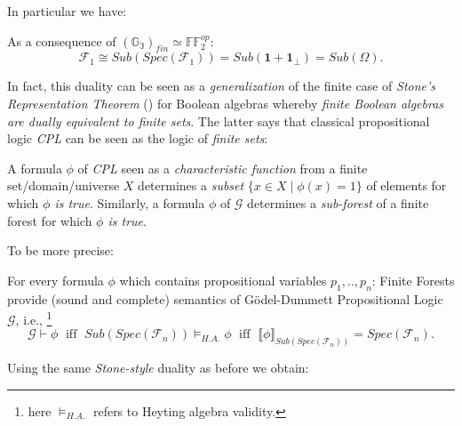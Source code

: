  	In particular we have: 
 
\begin{remark}
	As a consequence of $ (\mathbb{G_3})_{fin} \simeq \mathbb{FF}^{\textit{op}}_{2}$:
 \[\mathcal{F}_1 \cong Sub(Spec(\mathcal{F}_1)) = Sub(\textbf{1}+\textbf{1}_\bot) = Sub(\Omega).\] 
\end{remark}

In fact, this duality can be seen as a \emph{generalization} of the finite case of \emph{Stone's Representation Theorem} (\cite{stone}) for Boolean algebras whereby \emph{finite Boolean algebras are dually equivalent to finite sets}.
\newline
The latter says that classical propositional logic \emph{CPL} can be seen as the logic of \emph{finite sets}:

\begin{remark}
	A formula $\phi$ of \emph{CPL} seen as a \emph{characteristic function} from a finite set/domain/universe $X$ determines a \emph{subset} $\{x \in X \;|\; \phi(x) = 1\}$ of elements for which \emph{$\phi$ is true}.\newline
	Similarly, a formula $\phi$ of $\mathcal{G}$ determines a \emph{sub-forest} of a finite forest for which \emph{$\phi$ is true}.    
\end{remark}
To be more precise:
\begin{remark}
	For every formula $\phi$ which contains propositional variables $p_1,..,p_n$: \newline
	Finite Forests provide (sound and complete) semantics of Gödel-Dummett Propositional Logic $\mathcal{G}$,  i.e., \footnote{here $\models_{H.A.}$ refers to Heyting algebra validity.}
	\begin{equation*}
		\mathcal{G} \vdash \phi \;\text{ iff }\; Sub(Spec(\mathcal{F}_n)) \models_{H.A.} \phi \;\text{ iff }\; \llbracket \phi \rrbracket_{Sub(Spec(\mathcal{F}_n))}=Spec(\mathcal{F}_n).
	\end{equation*}
\end{remark}


\newpage
Using the same \emph{Stone-style} duality as before we obtain:

